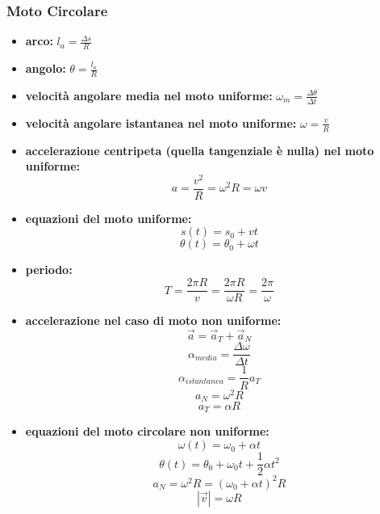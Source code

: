 \documentclass[a4paper,12pt, oneside]{book}
\begin{document}
\subsubsection{Moto Circolare}
\begin{itemize}
\item \textbf{arco:} $l_a=\frac{\Delta s}{R}$
\item \textbf{angolo:} $\theta=\frac{l_a}{R}$
\item \textbf{velocità angolare media nel moto uniforme:} $\omega_m=\frac{\Delta\theta}{\Delta t}$
\item \textbf{velocità angolare istantanea nel moto uniforme:} $\omega=\frac{v}{R}$
\item \textbf{accelerazione centripeta (quella tangenziale è nulla) nel moto uniforme:} 
$$a=\frac{v^2}{R}=\omega^2R=\omega v$$
\item \textbf{equazioni del moto uniforme:}
$$s(t)=s_0+vt$$
$$\theta(t)=\theta_0+\omega t$$
\item \textbf{periodo:}
$$T=\frac{2\pi R}{v}=\frac{2\pi R}{\omega R}=\frac{2\pi}{\omega}$$
\item \textbf{accelerazione nel caso di moto non uniforme:}
$$\vec{a}=\vec{a}_T+\vec{a}_N$$
$$\alpha_{media}=\frac{\Delta\omega}{\Delta t}$$
$$\alpha_{istantanea}=\frac{1}{R}a_T$$
$$a_N=\omega^2 R$$
$$a_T=\alpha R$$
\item \textbf{equazioni del moto circolare non uniforme:}
$$\omega(t)=\omega_0+\alpha t$$
$$\theta(t)=\theta_0+\omega_0t+\frac{1}{2}\alpha t^2$$
$$a_N=\omega^2 R=(\omega_0+\alpha t)^2 R$$
$$|\vec{v}|=\omega R$$
\end{itemize}
\end{document}
